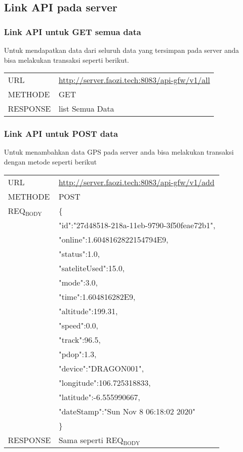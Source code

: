\documentclass[11pt]{article}
\begin{document}
\subsection{Link API pada server}
\label{sec:org6854931}
\subsubsection{Link API untuk GET semua data}
\label{sec:org380f757}
Untuk mendapatkan data dari seluruh data yang tersimpan pada
server anda bisa melakukan transaksi seperti berikut.
\begin{center}
\begin{tabular}{ll}
\hline
URL & \url{http://server.faozi.tech:8083/api-gfw/v1/all}\\
METHODE & GET\\
RESPONSE & list Semua Data\\
\end{tabular}
\end{center}

\subsubsection{Link API untuk POST data}
\label{sec:org8cd5396}
Untuk menambahkan data GPS pada server anda bisa melakukan
transaksi dengan metode seperti berikut
\begin{center}
\begin{tabular}{ll}
URL & \url{http://server.faozi.tech:8083/api-gfw/v1/add}\\
METHODE & POST\\
REQ\(_{\text{BODY}}\) & \{\\
 & "id":"27d48518-218a-11eb-9790-3f50feae72b1",\\
 & "online":1.6048162822154794E9,\\
 & "status":1.0,\\
 & "sateliteUsed":15.0,\\
 & "mode":3.0,\\
 & "time":1.604816282E9,\\
 & "altitude":199.31,\\
 & "speed":0.0,\\
 & "track":96.5,\\
 & "pdop":1.3,\\
 & "device":"DRAGON001",\\
 & "longitude":106.725318833,\\
 & "latitude":-6.555990667,\\
 & "dateStamp":"Sun Nov  8 06:18:02 2020\n"\\
 & \}\\
RESPONSE & Sama seperti REQ\(_{\text{BODY}}\)\\
\end{tabular}
\end{center}
\end{document}
